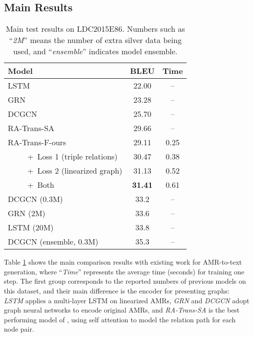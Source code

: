 \documentclass[11pt,a4paper]{article}
\begin{document}
\subsection{Main Results}


\begin{table}
\setlength\tabcolsep{4pt}
    \centering
    \begin{tabular}{lcc}
    \toprule
    Model & BLEU & Time \\
    \midrule
    LSTM \citep{konstas2017neural} & 22.00 & -- \\
    GRN \citep{song2018graph} & 23.28 & -- \\
    DCGCN \citep{guo2019densely} & 25.70 & -- \\
    RA-Trans-SA \citep{zhu2019modeling} & 29.66 & -- \\
    \hline
    RA-Trans-F-ours & 29.11 & 0.25 \\
    ~~~~~+~Loss 1 (triple relations) & 30.47 & 0.38 \\
    ~~~~~+~Loss 2 (linearized graph) & 31.13 & 0.52 \\
    ~~~~~+~Both & \textbf{31.41} & 0.61 \\
    \hline
    DCGCN (0.3M) & 33.2 & -- \\
    GRN (2M) & 33.6 & -- \\
    LSTM (20M) & 33.8 & -- \\
    DCGCN (ensemble, 0.3M) & 35.3 & -- \\
    \bottomrule
    \end{tabular}
    \caption{Main test results on LDC2015E86. Numbers such as ``\emph{2M}'' means the number of extra silver data being used, and ``\emph{ensemble}'' indicates model ensemble.}
    \label{tab:main}
    \vspace{-0.5em}
\end{table}


Table \ref{tab:main} shows the main comparison results with existing work for AMR-to-text generation, where ``\emph{Time}'' represents the average time (seconds) for training one step.
The first group corresponds to the reported numbers of previous models on this dataset, and their main difference is the encoder for presenting graphs:
\emph{LSTM} \citep{konstas2017neural} applies a multi-layer LSTM on linearized AMRs, \emph{GRN} \citep{song2018graph} and \emph{DCGCN} \citep{guo2019densely} adopt graph neural networks to encode original AMRs, and \emph{RA-Trans-SA} is the best performing model of \citet{zhu2019modeling}, 
using self attention to model the relation path for each node pair.
\end{document}
